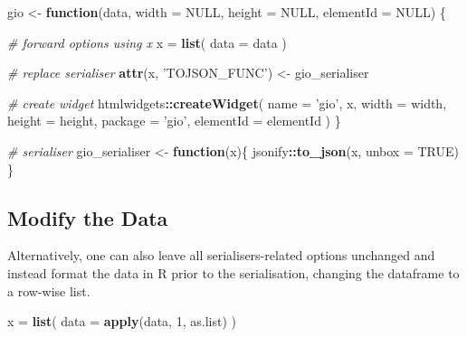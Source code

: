 \documentclass[10pt,]{krantz}
\makeatletter
\newenvironment{Shaded}{\begin{snugshade}}{\end{snugshade}}
\newcommand{\CommentTok}[1]{\textcolor[rgb]{0.37,0.37,0.37}{\textit{#1}}}
\newcommand{\ControlFlowTok}[1]{\textcolor[rgb]{0.27,0.27,0.27}{\textbf{#1}}}
\newcommand{\DataTypeTok}[1]{\textcolor[rgb]{0.27,0.27,0.27}{#1}}
\newcommand{\DecValTok}[1]{\textcolor[rgb]{0.06,0.06,0.06}{#1}}
\newcommand{\KeywordTok}[1]{\textcolor[rgb]{0.27,0.27,0.27}{\textbf{#1}}}
\newcommand{\NormalTok}[1]{#1}
\newcommand{\OperatorTok}[1]{\textcolor[rgb]{0.43,0.43,0.43}{\textbf{#1}}}
\newcommand{\OtherTok}[1]{\textcolor[rgb]{0.37,0.37,0.37}{#1}}
\newcommand{\StringTok}[1]{\textcolor[rgb]{0.5,0.5,0.5}{#1}}
\newenvironment{kframe}{%
\medskip{}
\setlength{\fboxsep}{.8em}
 \def\at@end@of@kframe{}%
 \ifinner\ifhmode%
  \def\at@end@of@kframe{\end{minipage}}%
  \begin{minipage}{\columnwidth}%
 \fi\fi%
 \def\FrameCommand##1{\hskip\@totalleftmargin \hskip-\fboxsep
 \colorbox{shadecolor}{##1}\hskip-\fboxsep
     \hskip-\linewidth \hskip-\@totalleftmargin \hskip\columnwidth}%
 \MakeFramed {\advance\hsize-\width
   \@totalleftmargin\z@ \linewidth\hsize
   \@setminipage}}%
 {\par\unskip\endMakeFramed%
 \at@end@of@kframe}
\renewenvironment{Shaded}{\begin{kframe}}{\end{kframe}}
\makeatother
\begin{document}
\begin{Shaded}
\begin{Highlighting}[]
\NormalTok{gio <-}\StringTok{ }\ControlFlowTok{function}\NormalTok{(data, }\DataTypeTok{width =} \OtherTok{NULL}\NormalTok{, }\DataTypeTok{height =} \OtherTok{NULL}\NormalTok{, }
  \DataTypeTok{elementId =} \OtherTok{NULL}\NormalTok{) \{}

  \CommentTok{# forward options using x}
\NormalTok{  x =}\StringTok{ }\KeywordTok{list}\NormalTok{(}
    \DataTypeTok{data =}\NormalTok{ data}
\NormalTok{  )}

  \CommentTok{# replace serialiser}
  \KeywordTok{attr}\NormalTok{(x, }\StringTok{'TOJSON_FUNC'}\NormalTok{) <-}\StringTok{ }\NormalTok{gio_serialiser}

  \CommentTok{# create widget}
\NormalTok{  htmlwidgets}\OperatorTok{::}\KeywordTok{createWidget}\NormalTok{(}
    \DataTypeTok{name =} \StringTok{'gio'}\NormalTok{,}
\NormalTok{    x,}
    \DataTypeTok{width =}\NormalTok{ width,}
    \DataTypeTok{height =}\NormalTok{ height,}
    \DataTypeTok{package =} \StringTok{'gio'}\NormalTok{,}
    \DataTypeTok{elementId =}\NormalTok{ elementId}
\NormalTok{  )}
\NormalTok{\}}

\CommentTok{# serialiser}
\NormalTok{gio_serialiser <-}\StringTok{ }\ControlFlowTok{function}\NormalTok{(x)\{}
\NormalTok{  jsonify}\OperatorTok{::}\KeywordTok{to_json}\NormalTok{(x, }\DataTypeTok{unbox =} \OtherTok{TRUE}\NormalTok{)}
\NormalTok{\}}
\end{Highlighting}
\end{Shaded}

\hypertarget{widgets-full-transform-data-modify-data}{%
\subsection{Modify the Data}\label{widgets-full-transform-data-modify-data}}

Alternatively, one can also leave all serialisers-related options unchanged and instead format the data in R prior to the serialisation, changing the dataframe to a row-wise list.

\begin{Shaded}
\begin{Highlighting}[]
\NormalTok{x =}\StringTok{ }\KeywordTok{list}\NormalTok{(}
  \DataTypeTok{data =} \KeywordTok{apply}\NormalTok{(data, }\DecValTok{1}\NormalTok{, as.list)}
\NormalTok{)}
\end{Highlighting}
\end{Shaded}
\end{document}
